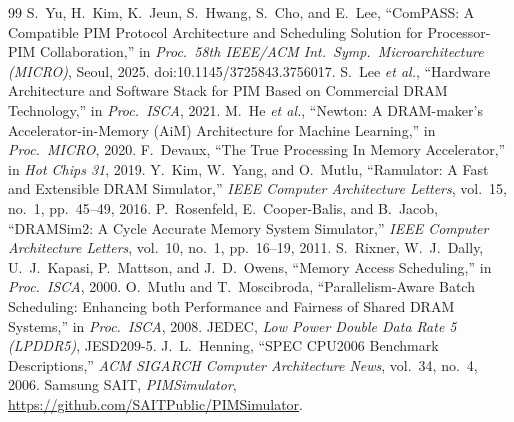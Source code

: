 \documentclass[conference]{IEEEtran}
\begin{document}
\begin{thebibliography}{99}
 S.~Yu, H.~Kim, K.~Jeun, S.~Hwang, S.~Cho, and E.~Lee, ``ComPASS: A Compatible PIM Protocol Architecture and Scheduling Solution for Processor-PIM Collaboration,'' in \emph{Proc.\ 58th IEEE/ACM Int.\ Symp.\ Microarchitecture (MICRO)}, Seoul, 2025. doi:10.1145/3725843.3756017.
 S.~Lee \emph{et al.}, ``Hardware Architecture and Software Stack for PIM Based on Commercial DRAM Technology,'' in \emph{Proc.\ ISCA}, 2021.
 M.~He \emph{et al.}, ``Newton: A DRAM-maker's Accelerator-in-Memory (AiM) Architecture for Machine Learning,'' in \emph{Proc.\ MICRO}, 2020.
 F.~Devaux, ``The True Processing In Memory Accelerator,'' in \emph{Hot Chips 31}, 2019.
 Y.~Kim, W.~Yang, and O.~Mutlu, ``Ramulator: A Fast and Extensible DRAM Simulator,'' \emph{IEEE Computer Architecture Letters}, vol.~15, no.~1, pp.~45--49, 2016.
 P.~Rosenfeld, E.~Cooper-Balis, and B.~Jacob, ``DRAMSim2: A Cycle Accurate Memory System Simulator,'' \emph{IEEE Computer Architecture Letters}, vol.~10, no.~1, pp.~16--19, 2011.
 S.~Rixner, W.~J.~Dally, U.~J.~Kapasi, P.~Mattson, and J.~D.~Owens, ``Memory Access Scheduling,'' in \emph{Proc.\ ISCA}, 2000.
 O.~Mutlu and T.~Moscibroda, ``Parallelism-Aware Batch Scheduling: Enhancing both Performance and Fairness of Shared DRAM Systems,'' in \emph{Proc.\ ISCA}, 2008.
 JEDEC, \emph{Low Power Double Data Rate 5 (LPDDR5)}, JESD209-5.
 J.~L.~Henning, ``SPEC CPU2006 Benchmark Descriptions,'' \emph{ACM SIGARCH Computer Architecture News}, vol.~34, no.~4, 2006.
 Samsung SAIT, \emph{PIMSimulator}, \url{https://github.com/SAITPublic/PIMSimulator}.
\end{thebibliography}
\end{document}
